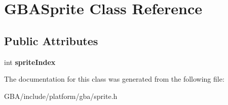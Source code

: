 \hypertarget{class_g_b_a_sprite}{\section{G\-B\-A\-Sprite Class Reference}
\label{class_g_b_a_sprite}
}
\subsection*{Public Attributes}
\begin{DoxyCompactItemize}
\item 
\hypertarget{class_g_b_a_sprite_a7ec5124ff20f8f8adbd90665bd63fd14}{int {\bfseries sprite\-Index}}\label{class_g_b_a_sprite_a7ec5124ff20f8f8adbd90665bd63fd14}

\end{DoxyCompactItemize}


The documentation for this class was generated from the following file\-:\begin{DoxyCompactItemize}
\item 
G\-B\-A/include/platform/gba/sprite.\-h\end{DoxyCompactItemize}
